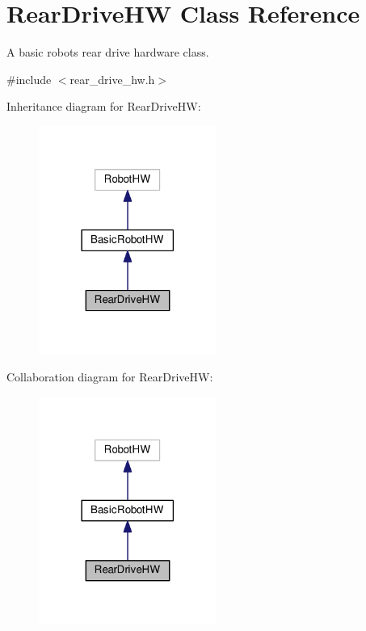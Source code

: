 \hypertarget{classRearDriveHW}{}\section{Rear\+Drive\+HW Class Reference}
\label{classRearDriveHW}


A basic robot\textquotesingle{}s rear drive hardware class.  




{\ttfamily \#include $<$rear\+\_\+drive\+\_\+hw.\+h$>$}



Inheritance diagram for Rear\+Drive\+HW\+:
\nopagebreak
\begin{figure}[H]
\begin{center}
\leavevmode
\includegraphics[width=165pt]{classRearDriveHW__inherit__graph}
\end{center}
\end{figure}


Collaboration diagram for Rear\+Drive\+HW\+:
\nopagebreak
\begin{figure}[H]
\begin{center}
\leavevmode
\includegraphics[width=165pt]{classRearDriveHW__coll__graph}
\end{center}
\end{figure}
